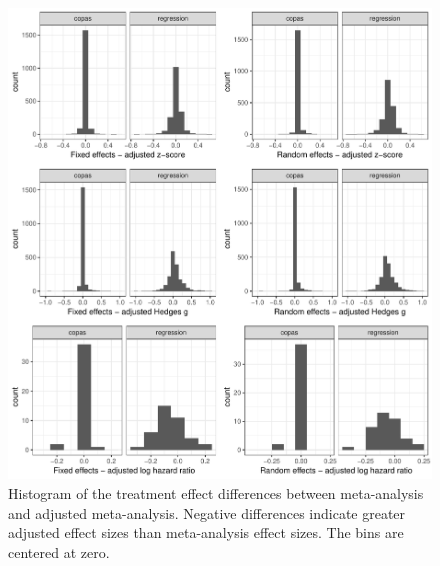 \documentclass[11pt,a4paper,twoside]{book}\usepackage[]{graphicx}\usepackage[]{color}
\newenvironment{knitrout}{}{} %
\begin{document}
\begin{figure}
\begin{knitrout}
\color{fgcolor}

{\centering \includegraphics[width=\textwidth-3cm]{figure/ch03_figunnamed-chunk-15-1} 

}



\end{knitrout}
\caption{Histogram of the treatment effect differences between meta-analysis and adjusted meta-analysis. Negative differences indicate greater adjusted effect sizes than meta-analysis effect sizes. The bins are centered at zero.}
\label{fig:adjustment.size}
\end{figure}
\end{document}

